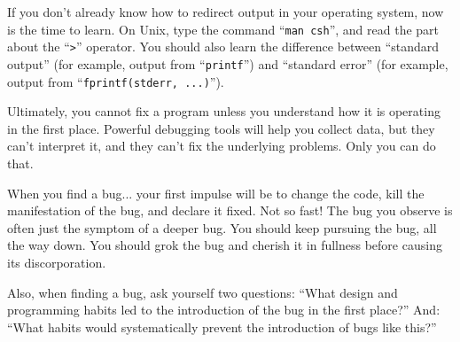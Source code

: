 \documentclass{article}
\begin{document}
If you don't already know how to redirect output in your operating system, now is the time to learn.  On Unix, type the command ``\texttt{man csh}'', and read the part about the ``\texttt{>}'' operator.  You should also learn the difference between ``standard output'' (for example, output from ``\texttt{printf}'') and ``standard error'' (for example, output from ``\texttt{fprintf(stderr, ...)}'').
\par
Ultimately, you cannot fix a program unless you understand how it is operating in the first place.  Powerful debugging tools will help you collect data, but they can't interpret it, and they can't fix the underlying problems.  Only you can do that.
\par
When you find a bug... your first impulse will be to change the code, kill the manifestation of the bug, and declare it fixed.  Not so fast! The bug you observe is often just the symptom of a deeper bug.  You should keep pursuing the bug, all the way down.  You should grok the bug and cherish it in fullness before causing its discorporation.
\par
Also, when finding a bug, ask yourself two questions: ``What design and programming habits led to the introduction of the bug in the first place?''  And: ``What habits would systematically prevent the introduction of bugs like this?''
\end{document}
